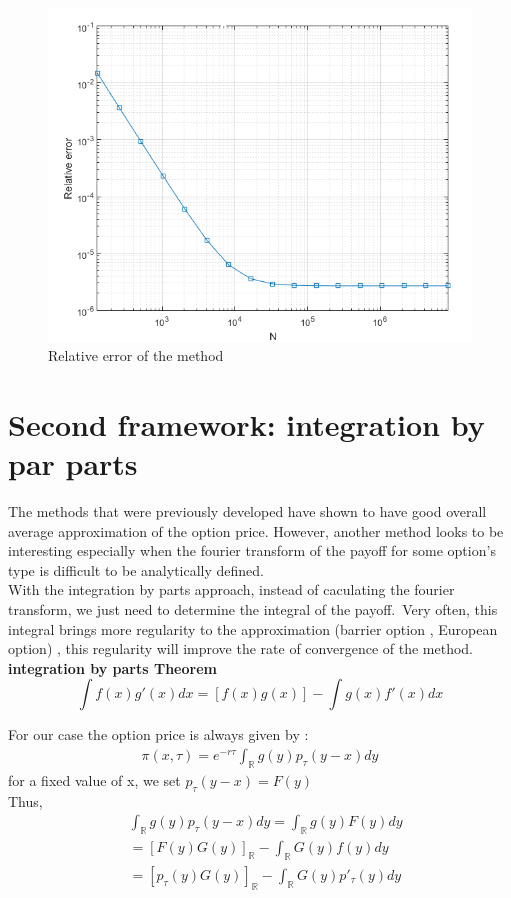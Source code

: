 \documentclass[12pt]{report}
\begin{document}
 
\begin{figure}[H]
\centering
\includegraphics{2.png} 
\caption{Relative error of the method}
\end{figure}
\section{Second framework: integration by par parts }

The methods that were previously developed have shown to have good overall average approximation of the option price. However, another method looks to be interesting especially when the fourier transform of the payoff for some option's type is difficult to be analytically defined.\\
With the integration by parts approach, instead of caculating the fourier transform, we just need to  determine the integral of the payoff.~Very often, this integral brings more regularity to the approximation (barrier option , European option) , this regularity will improve the rate of convergence of the method.\\

\textbf{ integration by parts Theorem }
\begin{equation*}
\int f(x) g'(x) dx =  [f(x) g(x)] - \int g(x) f'(x)  dx 
\end{equation*}

For our case the option price is always given by :
\begin{gather*}
\pi(x, \tau)=e^{-r\tau} \int_{\mathbb{R}}g(y)p_{\tau}(y-x)dy 
\end{gather*}
for a fixed value of x, we set $p_{\tau}(y-x)=F(y) $\\
Thus, 
\begin{align*}
&\int_{\mathbb{R}}g(y)p_{\tau}(y-x)dy =\int_{\mathbb{R}}g(y)F(y)dy\\
&=[F(y) G(y)]_{\mathbb{R}} - \int_{\mathbb{R}} G(y) f(y)  dy\\
&=[p_{\tau}(y) G(y)]_{\mathbb{R}} - \int_{\mathbb{R}} G(y) p'_{\tau}(y)  dy
\end{align*}
\end{document}
